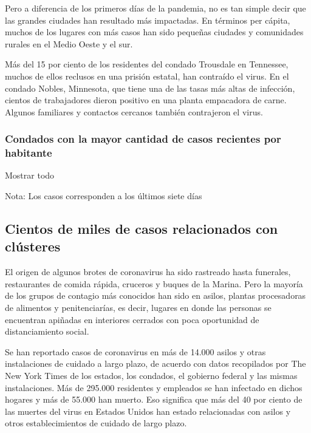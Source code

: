 Pero a diferencia de los primeros días de la pandemia, no es tan simple
decir que las grandes ciudades han resultado más impactadas. En términos
per cápita, muchos de los lugares con más casos han sido pequeñas
ciudades y comunidades rurales en el Medio Oeste y el sur.

Más del 15 por ciento de los residentes del condado Trousdale en
Tennessee, muchos de ellos reclusos en una prisión estatal, han
contraído el virus. En el condado Nobles, Minnesota, que tiene una de
las tasas más altas de infección, cientos de trabajadores dieron
positivo en una planta empacadora de carne. Algunos familiares y
contactos cercanos también contrajeron el virus.

\hypertarget{condados-con-la-mayor-cantidad-de-casos-recientes-por-habitante}{%
\subsubsection{Condados con la mayor cantidad de casos recientes por
habitante}\label{condados-con-la-mayor-cantidad-de-casos-recientes-por-habitante}}

Mostrar todo

Nota: Los casos corresponden a los últimos siete días

\hypertarget{cientos-de-miles-de-casos-relacionados-con-cluxfasteres}{%
\subsection{Cientos de miles de casos relacionados con
clústeres}\label{cientos-de-miles-de-casos-relacionados-con-cluxfasteres}}

El origen de algunos brotes de coronavirus ha sido rastreado hasta
funerales, restaurantes de comida rápida, cruceros y buques de la
Marina. Pero la mayoría de los grupos de contagio más conocidos han sido
en asilos, plantas procesadoras de alimentos y penitenciarías, es decir,
lugares en donde las personas se encuentran apiñadas en interiores
cerrados con poca oportunidad de distanciamiento social.

Se han reportado casos de coronavirus en más de 14.000 asilos y otras
instalaciones de cuidado a largo plazo, de acuerdo con datos recopilados
por The New York Times de los estados, los condados, el gobierno federal
y las mismas instalaciones. Más de 295.000 residentes y empleados se han
infectado en dichos hogares y más de 55.000 han muerto. Eso significa
que más del 40 por ciento de las muertes del virus en Estados Unidos han
estado relacionadas con asilos y otros establecimientos de cuidado de
largo plazo.

